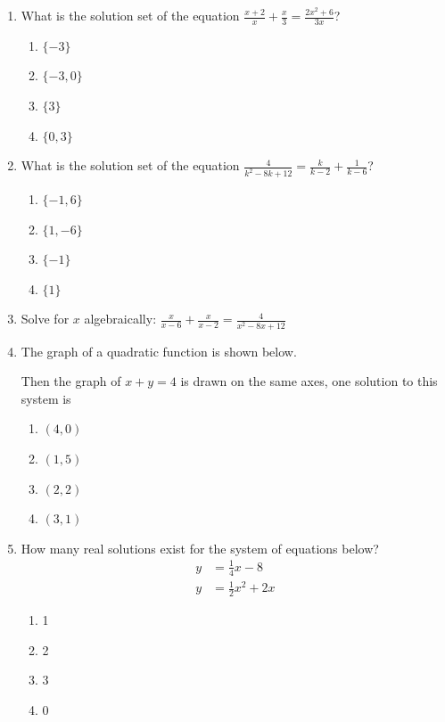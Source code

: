 \documentclass[12pt, twoside]{article}
\begin{document}
\begin{enumerate}[itemsep=0.5cm]
\item What is the solution set of the equation \(\displaystyle \frac{x+2}{x} + \frac{x}{3} = \frac{2x^2+6}{3x}\)? %
\begin{enumerate}
    \item \(\{-3\}\)
    \item \(\{-3, 0\}\)
    \item \(\{3\}\)
    \item \(\{0, 3\}\)
\end{enumerate}

\item What is the solution set of the equation \(\displaystyle \frac{4}{k^2-8k+12} = \frac{k}{k-2} + \frac{1}{k-6} \)? %
\begin{enumerate}
    \item \(\{-1,6\}\)
    \item \(\{1, -6\}\)
    \item \(\{-1\}\)
    \item \(\{1\}\)
\end{enumerate}

\item Solve for $x$ algebraically: \(\displaystyle \frac{x}{x-6} + \frac{x}{x-2} = \frac{4}{x^2-8x+12}\) %

\item The graph of a quadratic function is shown below. %
\begin{center}
    \end{center}
Then the graph of $x + y = 4$ is drawn on the same axes, one solution
to this system is
\begin{enumerate}
    \item $(4,0)$
    \item $(1,5)$
    \item $(2,2)$
    \item $(3,1)$
\end{enumerate}

\item How many real solutions exist for the system of equations below? %
\begin{align*}
    y &= \frac{1}{4} x - 8 \\
    y &= \frac{1}{2} x^2 + 2x
\end{align*}
\begin{enumerate}
    \item 1
    \item 2
    \item 3
    \item 0
\end{enumerate}


\end{enumerate}
\end{document}
